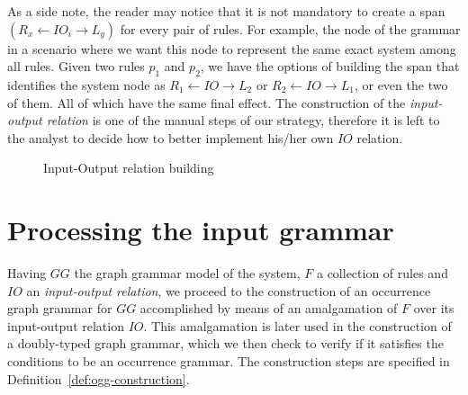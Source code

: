 \begin{example}\label{ex:inout}  

As a side note, the reader may notice that it is not mandatory to create a span \mbox{$\left(R_x \leftarrow IO_i \rightarrow L_y\right)$} for every pair of rules. For example, the  node of the grammar in a scenario where we want this node to represent the same exact system among all rules. Given two rules $p_1$ and $p_2$, we have the options of building the span that identifies the system node as
  $R_1 \leftarrow IO \rightarrow L_2$ or $R_2 \leftarrow IO \rightarrow L_1$, or even the two of them. All of which have the same final effect. The construction of the \textit{input-output relation} is one of the manual steps of our strategy, therefore it is left to the analyst to decide how to better implement his/her own $IO$ relation.

\begin{figure}[!ht]
  \centering
  \caption{Input-Output relation building}\label{fig:tests:inout}
\end{figure}

\end{example}

\section{Processing the input grammar}

  Having $GG$ the graph grammar model of the system, $F$ a collection of rules and $IO$ an \emph{input-output relation}, we proceed to the construction of an occurrence graph grammar for $GG$ accomplished by means of an amalgamation of $F$ over its input-output relation $IO$. This amalgamation is later used in the construction of a doubly-typed graph grammar, which we then check to verify if it satisfies the conditions to be an occurrence grammar. The construction steps are specified in Definition~\ref{def:ogg-construction}.

